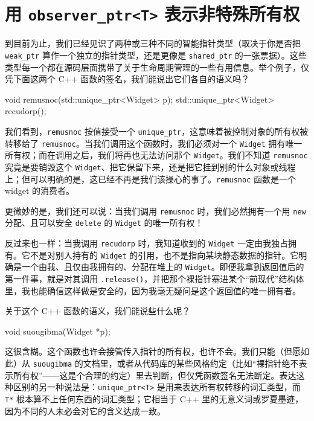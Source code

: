 \section{用 \texttt{observer\_\allowbreak{}ptr<\allowbreak{}T>\allowbreak{}} 表示非特殊所有权}

到目前为止，我们已经见识了两种或三种不同的智能指针类型（取决于你是否把 \texttt{weak\_\allowbreak{}ptr} 算作一个独立的指针类型，还是更像是 \texttt{shared\_\allowbreak{}ptr} 的一张票据）。这些类型每一个都在源码层面携带了关于生命周期管理的一些有用信息。举个例子，仅凭下面这两个 C++ 函数的签名，我们能说出它们各自的语义吗？

\begin{codebox}[cpp]
    void remusnoc(std::unique_ptr<Widget> p);
    std::unique_ptr<Widget> recudorp();
\end{codebox}

我们看到，\texttt{remusnoc} 按值接受一个 \texttt{unique\_\allowbreak{}ptr}，这意味着被控制对象的所有权被转移给了 \texttt{remusnoc}。当我们调用这个函数时，我们必须对一个 \texttt{Widget} 拥有唯一所有权；而在调用之后，我们将再也无法访问那个 \texttt{Widget}。我们不知道 \texttt{remusnoc} 究竟是要销毁这个 \texttt{Widget}、把它保留下来，还是把它挂到别的什么对象或线程上；但可以明确的是，这已经不再是我们该操心的事了。\texttt{remusnoc} 函数是一个 widget 的消费者。

更微妙的是，我们还可以说：当我们调用 \texttt{remusnoc} 时，我们必然拥有一个用 \texttt{new} 分配、且可以安全 \texttt{delete} 的 \texttt{Widget} 的唯一所有权！

反过来也一样：当我调用 \texttt{recudorp} 时，我知道收到的 \texttt{Widget} 一定由我独占拥有。它不是对别人持有的 \texttt{Widget} 的引用，也不是指向某块静态数据的指针。它明确是一个由我、且仅由我拥有的、分配在堆上的 \texttt{Widget}。即便我拿到返回值后的第一件事，就是对其调用 \texttt{.release(\allowbreak{})\allowbreak{}}，并把那个裸指针塞进某个“前现代”结构体里，我也能确信这样做是安全的，因为我毫无疑问是这个返回值的唯一拥有者。

关于这个 C++ 函数的语义，我们能说些什么呢？

\begin{codebox}[cpp]
    void suougibma(Widget *p);
\end{codebox}

这很含糊。这个函数也许会接管传入指针的所有权，也许不会。我们只能（但愿如此）从 \texttt{suougibma} 的文档里，或者从代码库的某些风格约定（比如“裸指针绝不表示所有权”——这是个合理的约定）里去判断，但仅凭函数签名无法断定。表达这种区别的另一种说法是：\texttt{unique\_\allowbreak{}ptr<\allowbreak{}T>\allowbreak{}} 是用来表达所有权转移的词汇类型，而 \texttt{T*} 根本算不上任何东西的词汇类型；它相当于 C++ 里的无意义词或罗夏墨迹，因为不同的人未必会对它的含义达成一致。

